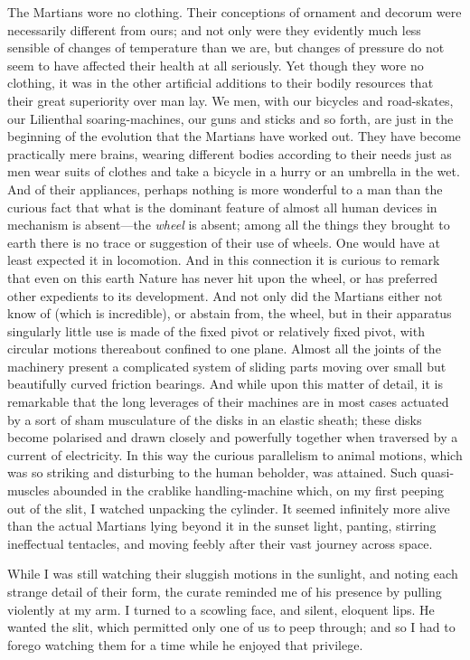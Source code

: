 The Martians wore no clothing. Their conceptions of ornament and decorum were necessarily different from ours; and not only were they evidently much less sensible of changes of temperature than we are, but changes of pressure do not seem to have affected their health at all seriously. Yet though they wore no clothing, it was in the other artificial additions to their bodily resources that their great superiority over man lay. We men, with our bicycles and road-skates, our Lilienthal soaring-machines, our guns and sticks and so forth, are just in the beginning of the evolution that the Martians have worked out. They have become practically mere brains, wearing different bodies according to their needs just as men wear suits of clothes and take a bicycle in a hurry or an umbrella in the wet. And of their appliances, perhaps nothing is more wonderful to a man than the curious fact that what is the dominant feature of almost all human devices in mechanism is absent—the \textit{wheel} is absent; among all the things they brought to earth there is no trace or suggestion of their use of wheels. One would have at least expected it in locomotion. And in this connection it is curious to remark that even on this earth Nature has never hit upon the wheel, or has preferred other expedients to its development. And not only did the Martians either not know of (which is incredible), or abstain from, the wheel, but in their apparatus singularly little use is made of the fixed pivot or relatively fixed pivot, with circular motions thereabout confined to one plane. Almost all the joints of the machinery present a complicated system of sliding parts moving over small but beautifully curved friction bearings. And while upon this matter of detail, it is remarkable that the long leverages of their machines are in most cases actuated by a sort of sham musculature of the disks in an elastic sheath; these disks become polarised and drawn closely and powerfully together when traversed by a current of electricity. In this way the curious parallelism to animal motions, which was so striking and disturbing to the human beholder, was attained. Such quasi-muscles abounded in the crablike handling-machine which, on my first peeping out of the slit, I watched unpacking the cylinder. It seemed infinitely more alive than the actual Martians lying beyond it in the sunset light, panting, stirring ineffectual tentacles, and moving feebly after their vast journey across space.

While I was still watching their sluggish motions in the sunlight, and noting each strange detail of their form, the curate reminded me of his presence by pulling violently at my arm. I turned to a scowling face, and silent, eloquent lips. He wanted the slit, which permitted only one of us to peep through; and so I had to forego watching them for a time while he enjoyed that privilege.


